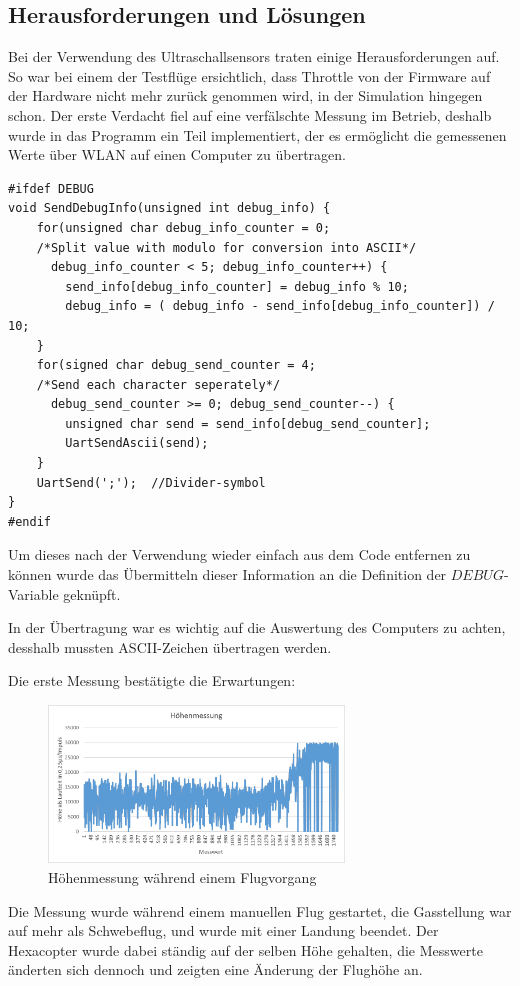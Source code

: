   \subsection{Herausforderungen und Lösungen}
  Bei der Verwendung des Ultraschallsensors traten einige Herausforderungen auf. So war bei einem der Testflüge ersichtlich, dass Throttle von der Firmware auf der Hardware nicht mehr
  zurück genommen wird, in der Simulation hingegen schon. Der erste Verdacht fiel auf eine verfälschte Messung im Betrieb, deshalb wurde in das Programm ein Teil implementiert, der
  es ermöglicht die gemessenen Werte über WLAN auf einen Computer zu übertragen.
  \lstset{language = c}
  \begin{lstlisting}
#ifdef DEBUG
void SendDebugInfo(unsigned int debug_info) {
    for(unsigned char debug_info_counter = 0;
    /*Split value with modulo for conversion into ASCII*/
      debug_info_counter < 5; debug_info_counter++) {
        send_info[debug_info_counter] = debug_info % 10;
        debug_info = ( debug_info - send_info[debug_info_counter]) / 10;
    }
    for(signed char debug_send_counter = 4;
    /*Send each character seperately*/
      debug_send_counter >= 0; debug_send_counter--) {
        unsigned char send = send_info[debug_send_counter];
        UartSendAscii(send);
    }
    UartSend(';');  //Divider-symbol
}
#endif
  \end{lstlisting}

  Um dieses nach der Verwendung wieder einfach aus dem Code entfernen zu können wurde das Übermitteln dieser Information an die Definition der $DEBUG$-Variable geknüpft.

  In der Übertragung war es wichtig auf die Auswertung des Computers zu achten, desshalb mussten ASCII-Zeichen übertragen werden.

  Die erste Messung bestätigte die Erwartungen:
  \begin{figure}[H]
    \begin{centering}
      \includegraphics[width = 0.7\textwidth]{Bilder/Hoehenmessung}
    \par\end{centering}
    \caption{Höhenmessung während einem Flugvorgang}
    \label{Hoehenmessung}
  \end{figure}
  Die Messung wurde während einem manuellen Flug gestartet, die Gasstellung war auf mehr als Schwebeflug, und wurde mit einer Landung beendet. Der Hexacopter wurde dabei ständig
  auf der selben Höhe gehalten, die Messwerte änderten sich dennoch und zeigten eine Änderung der Flughöhe an.

